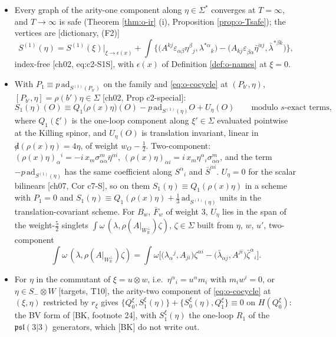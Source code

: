 \begin{proposition}
\label{prop:o-S}
\begin{itemize}
\item[(i)] Every graph of the arity-one component along $\eta\in\Sigma^*$ converges at $T=\infty$, and $T\to\infty$ is safe (Theorem \ref{thm:o-ir} (i), Proposition \ref{prop:o-Tsafe}); the vertices are [dictionary, (F2)]
\[
S^{(1)}(\eta)=S^{(1)}(\xi)\big|_{\xi\to\epsilon(x)}+\int\Big\{\big(A^{kj}\varepsilon_{\alpha\beta}\eta^\beta{}_j,\lambda^{*\alpha}{}_k\big)-\big(A_{kj}\varepsilon_{\dot\beta\dot\alpha}\bar\eta^{\dot\alpha j},\bar\lambda^{*\dot\beta k}\big)\Big\},
\]
index-free [ch02, eq:c2-S1S], with $\epsilon(x)$ of Definition \ref{def:o-names} at $\xi=0$.
\item[(ii)] With $P_1\equiv p\,\mathrm{ad}_{S^{(1)}(P_{b'})}$ on the family and \eqref{eq:o-cocycle} at $(P_{b'},\eta)$, $[P_{b'},\eta]=\rho(b')\eta\in\Sigma$ [ch02, Prop c2-special]:
\begin{equation}
S_1(\eta)(O)\equiv Q_1\big(\rho(x)\eta\big)(O)-p\,\mathrm{ad}_{S^{(1)}(\eta)}O+U_\eta(O)\qquad\text{modulo }s\text{-exact terms},
\label{eq:o-SQ}
\end{equation}
where $Q_1(\xi')$ is the one-loop component along $\xi'\in\Sigma$ evaluated pointwise at the Killing spinor, and $U_\eta(O)$ is translation invariant, linear in ${\not d}(\rho(x)\eta)=4\eta$, of weight $w_O-\tfrac12$. Two-component: $(\rho(x)\eta)_\alpha{}^i=-i\,x_m\sigma^m_{\alpha\dot\alpha}\bar\eta^{\dot\alpha i}$, $(\rho(x)\eta)_{\dot\alpha i}=i\,x_m\eta^\alpha{}_i\sigma^m_{\alpha\dot\alpha}$, and the term $-p\,\mathrm{ad}_{S^{(1)}(\eta)}$ has the same coefficient along $S^\alpha{}_i$ and $\bar S^{\dot\alpha i}$. $U_\eta=0$ for the scalar bilinears [ch07, Cor c7-S], so on them $S_1(\eta)\equiv Q_1(\rho(x)\eta)$ in a scheme with $P_1=0$ and $S_1(\eta)\equiv Q_1(\rho(x)\eta)+\tfrac13\,\mathrm{ad}_{S^{(1)}(\eta)}$ units in the translation-covariant scheme. For $B_w$, $\bar F_w$ of weight $3$, $U_\eta$ lies in the span of the weight-$\tfrac52$ singlets $\int\omega\,(\lambda,\rho(A|_{W_{\mathbb R}^\perp})\zeta)$, $\zeta\in\Sigma$ built from $\eta$, $w$, $u'$, two-component
\[
\int\omega\,(\lambda,\rho(A|_{W_{\mathbb R}^\perp})\zeta)=\int\omega\Big[\big(\lambda_\alpha{}^j,A_{ji}\big)\zeta^{\alpha i}-\big(\bar\lambda_{\dot\alpha j},A^{ji}\big)\bar\zeta^{\dot\alpha}{}_i\Big].
\]
\item[(iii)] For $\eta$ in the commutant of $\xi=u\otimes w$, i.e.\ $\eta^\alpha{}_i=u^\alpha m_i$ with $m_iw^i=0$, or $\eta\in S_-\otimes W$ [targets, T10], the arity-two component of \eqref{eq:o-cocycle} at $(\xi,\eta)$ restricted by $r_\xi$ gives $\{Q^\xi_0,S_1^\xi(\eta)\}+\{S_0^\xi(\eta),Q^\xi_1\}\equiv0$ on $H(Q^\xi_0)$: the BV form of [BK, footnote 24], with $S_1^\xi(\eta)$ the one-loop $R_1$ of the $\mathfrak{psl}(3|3)$ generators, which [BK] do not write out.
\end{itemize}
\end{proposition}

